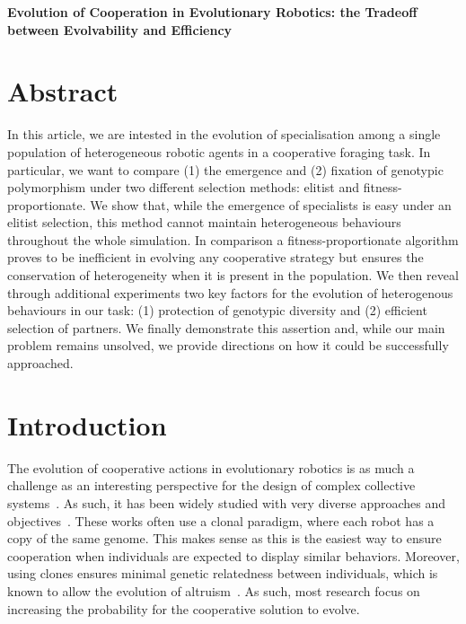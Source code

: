 \clearpage

\begin{flushleft}
\textbf{\Huge Evolution of Cooperation in Evolutionary Robotics: the Tradeoff between Evolvability and Efficiency}
\end{flushleft}

\section{Abstract}
  In this article, we are intested in the evolution of specialisation among a single population of heterogeneous robotic agents in a cooperative foraging task. In particular, we want to compare (1) the emergence and (2) fixation of genotypic polymorphism under two different selection methods: elitist and fitness-proportionate. We show that, while the emergence of specialists is easy under an elitist selection, this method cannot maintain heterogeneous behaviours throughout the whole simulation. In comparison a fitness-proportionate algorithm proves to be inefficient in evolving any cooperative strategy but ensures the conservation of heterogeneity when it is present in the population. We then reveal through additional experiments two key factors for the evolution of heterogenous behaviours in our task: (1) protection of genotypic diversity and (2) efficient selection of partners. We finally demonstrate this assertion and, while our main problem remains unsolved, we provide directions on how it could be successfully approached.


\section{Introduction}

  The evolution of cooperative actions in evolutionary robotics is as much a challenge as an interesting perspective for the design of complex collective systems~\parencite{Doncieux2015a}. As such, it has been widely studied with very diverse approaches and objectives~\parencite{Waibel2009, Hauert2014, Trianni2007, Lichocki2012}. These works often use a clonal paradigm, where each robot has a copy of the same genome. This makes sense as this is the easiest way to ensure cooperation when individuals are expected to display similar behaviors. Moreover, using clones ensures minimal genetic relatedness between individuals, which is known to allow the evolution of altruism~\parencite{Waibel2011, Montanier2011}. As such, most research focus on increasing the probability for the cooperative solution to evolve.

